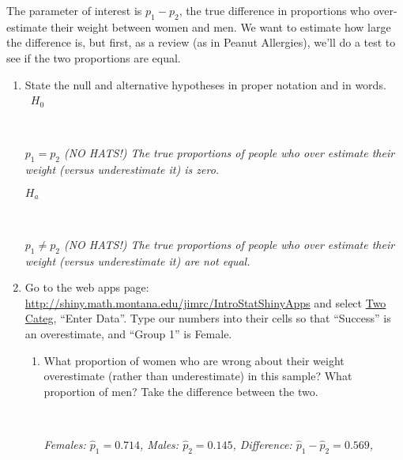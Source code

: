   The parameter of interest is $p_1 - p_2$, the true difference in
  proportions who over-estimate their weight between women and men. 
  We want to estimate how large the difference is, but first, as a
  review (as in Peanut Allergies), we'll do a test to see if the two
  proportions are equal. 
  \vspace{-.2in}
  \begin{enumerate}

  \item  State the null and alternative hypotheses in proper notation
    and in words.\\ \ 
    $H_0$
\begin{students}
 \ \   \vspace{1cm}\\
\end{students}
\begin{key}
  {\it $p_1 = p_2$  (NO HATS!) The true proportions of people who over
    estimate their weight (versus underestimate it) is zero.}
    \\
\end{key}
    $H_a$
\begin{students}
 \ \   \vspace{1cm}\\
\end{students}
\begin{key}
  {\it $p_1 \neq p_2$  (NO HATS!) The true proportions of people who over
    estimate their weight (versus underestimate it) are not equal. 
    } \\
\end{key}
    \item \label{testWeight}
   Go to the  web apps page:
   \url{http://shiny.math.montana.edu/jimrc/IntroStatShinyApps}
   and select \underline{\sf Two Categ}, ``Enter Data''.  Type our numbers into
   their cells so that ``Success'' is an overestimate, and ``Group 1'' is
   Female.  
   \begin{enumerate}
     \item \label{refWeights} What proportion of women who are wrong
       about their weight overestimate  (rather than underestimate) in this
       sample?  What proportion of men?  Take 
       the difference between the two. 
\begin{students}
 \ \   \vspace*{2cm}\\
\end{students}
\begin{key}
  {\it Females: $\widehat{p}_1 = 0.714$, Males: $\widehat{p}_2 =
    0.145$,  Difference: $\widehat{p}_1  - \widehat{p}_2 =    0.569$,
    } 
\end{key}


\end{enumerate}
\end{enumerate}
